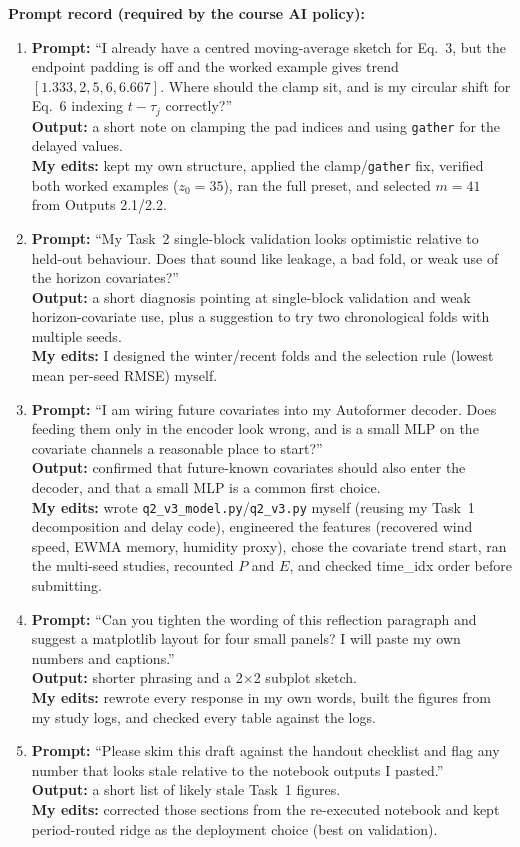\documentclass[10pt,a4paper]{article}
\begin{document}
\textbf{Prompt record (required by the course AI policy):}
\begin{enumerate}
\item \textbf{Prompt:} ``I already have a centred moving-average sketch for Eq.~3, but the endpoint padding is off and the worked example gives trend $[1.333,2,5,6,6.667]$. Where should the clamp sit, and is my circular shift for Eq.~6 indexing $t-\tau_j$ correctly?''\\
\textbf{Output:} a short note on clamping the pad indices and using \texttt{gather} for the delayed values.\\
\textbf{My edits:} kept my own structure, applied the clamp/\texttt{gather} fix, verified both worked examples ($z_0=35$), ran the full preset, and selected $m=41$ from Outputs 2.1/2.2.
\item \textbf{Prompt:} ``My Task~2 single-block validation looks optimistic relative to held-out behaviour. Does that sound like leakage, a bad fold, or weak use of the horizon covariates?''\\
\textbf{Output:} a short diagnosis pointing at single-block validation and weak horizon-covariate use, plus a suggestion to try two chronological folds with multiple seeds.\\
\textbf{My edits:} I designed the winter/recent folds and the selection rule (lowest mean per-seed RMSE) myself.
\item \textbf{Prompt:} ``I am wiring future covariates into my Autoformer decoder. Does feeding them only in the encoder look wrong, and is a small MLP on the covariate channels a reasonable place to start?''\\
\textbf{Output:} confirmed that future-known covariates should also enter the decoder, and that a small MLP is a common first choice.\\
\textbf{My edits:} wrote \texttt{q2\_v3\_model.py}/\texttt{q2\_v3.py} myself (reusing my Task~1 decomposition and delay code), engineered the features (recovered wind speed, EWMA memory, humidity proxy), chose the covariate trend start, ran the multi-seed studies, recounted $P$ and $E$, and checked time\_idx order before submitting.
\item \textbf{Prompt:} ``Can you tighten the wording of this reflection paragraph and suggest a matplotlib layout for four small panels? I will paste my own numbers and captions.''\\
\textbf{Output:} shorter phrasing and a 2$\times$2 subplot sketch.\\
\textbf{My edits:} rewrote every response in my own words, built the figures from my study logs, and checked every table against the logs.
\item \textbf{Prompt:} ``Please skim this draft against the handout checklist and flag any number that looks stale relative to the notebook outputs I pasted.''\\
\textbf{Output:} a short list of likely stale Task~1 figures.\\
\textbf{My edits:} corrected those sections from the re-executed notebook and kept period-routed ridge as the deployment choice (best on validation).
\end{enumerate}
\end{document}
